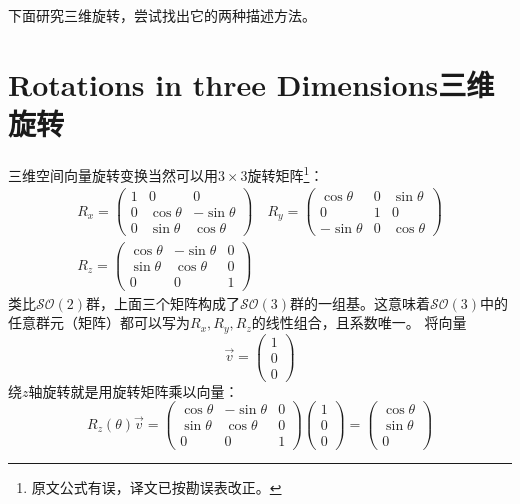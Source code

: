 下面研究三维旋转，尝试找出它的两种描述方法。

\section[三维旋转]{Rotations in three Dimensions\quad 三维旋转}
\label{sec3.3}
三维空间向量旋转变换当然可以用$3 \times 3$旋转矩阵\footnote{原文公式有误，译文已按勘误表改正。}：
\begin{align}
R_x =
	\begin{pmatrix}
		1 & 0 & 0 \\
		0 & \cos \theta & -\sin \theta \\
		0 & \sin \theta & \cos \theta
	\end{pmatrix}
\quad
R_y = 
	\begin{pmatrix}
		\cos \theta & 0 & \sin \theta \\
		0 & 1 & 0 \\
		-\sin \theta & 0 & \cos \theta
	\end{pmatrix}
\nonumber \\
\label{equ3.23}
R_z =
	\begin{pmatrix}
		\cos \theta & -\sin \theta & 0 \\
		\sin \theta & \cos \theta & 0 \\
		0 & 0 & 1
	\end{pmatrix}
\end{align}
类比$\mathcal{SO}(2)$群，上面三个矩阵构成了$\mathcal{SO}(3)$群的一组基。这意味着$\mathcal{SO}(3)$中的任意群元（矩阵）都可以写为$R_x, R_y, R_z$的线性组合，且系数唯一。
将向量
\begin{equation*}
\vec{v} = \begin{pmatrix}
			1 \\ 0 \\ 0
		\end{pmatrix}
\end{equation*}
绕$z$轴旋转就是用旋转矩阵乘以向量：
\begin{equation}
\label{equ3.24}
R_z(\theta) \vec{v} = 
	\begin{pmatrix}
		\cos \theta & -\sin \theta & 0 \\
		\sin \theta & \cos \theta & 0 \\
		0 & 0 & 1
	\end{pmatrix}
	\begin{pmatrix}
		1 \\ 0 \\ 0
	\end{pmatrix}
=
	\begin{pmatrix}
		\cos \theta \\ \sin \theta \\ 0
	\end{pmatrix}
\end{equation}
